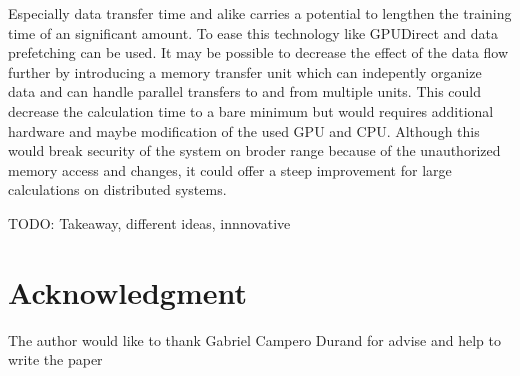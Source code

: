 \documentclass[conference]{IEEEtran}
\begin{document}
Especially data transfer time and alike carries a potential to lengthen the training time of an significant amount. To ease this technology like GPUDirect\cite{nvidiagpudirect2017} and data prefetching\cite{yang2010gpgpu} can be used. It may be possible to decrease the effect of the data flow further by introducing a memory transfer unit which can indepently organize data and can handle parallel transfers to and from multiple units. This could decrease the calculation time to a bare minimum but would requires additional hardware and maybe modification of the used GPU and CPU.  Although this would break security of the system on broder range because of the unauthorized memory access and changes, it could offer a steep improvement for large calculations on distributed systems.

TODO: Takeaway, different ideas, innnovative

\section*{Acknowledgment}
The author would like to thank Gabriel Campero Durand for advise and help to write the paper







\end{document}
